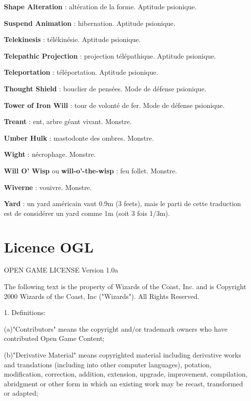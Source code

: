 \documentclass[11pt]{article}
\begin{document}
{\textbf{Shape Alteration} : altération de la forme. Aptitude psionique.

\textbf{Suspend Animation} : hibernation. Aptitude psionique.

\textbf{Telekinesis} : télékinésie. Aptitude psionique.

\textbf{Telepathic Projection} : projection télépathique. Aptitude psionique.

\textbf{Teleportation} : téléportation. Aptitude psionique.

\textbf{Thought Shield} : bouclier de pensées. Mode de défense psionique.

\textbf{Tower of Iron Will} : tour de volonté de fer. Mode de défense psionique.

\textbf{Treant} : ent, arbre géant vivant. Monstre.

\textbf{Umber Hulk} : mastodonte des ombres. Monstre.

\textbf{Wight} : nécrophage. Monstre.

\textbf{Will O’ Wisp} ou \textbf{will-o'-the-wisp} : feu follet. Monstre.

\textbf{Wiverne} : vouivre. Monstre.

\textbf{Yard} : un yard américain vaut 0.9m (3 feets), mais le parti de cette traduction est de considérer un yard comme 1m (soit 3 fois 1/3m).

}%


\newpage
{}\section*{Licence OGL}
\label{OGL}

OPEN GAME LICENSE Version 1.0a

\bigskip

The following text is the property of Wizards of the Coast, Inc. and is Copyright 2000 Wizards of the Coast, Inc ("Wizards"). All Rights Reserved.

\bigskip

1. Definitions:

\bigskip

(a)"Contributors" means the copyright and/or trademark owners who have contributed Open Game Content;

\bigskip

(b)"Derivative Material" means copyrighted material including derivative works and translations (including into other computer languages), potation, modification, correction, addition, extension, upgrade, improvement, compilation, abridgment or other form in which an existing work may be recast, transformed or adapted;
\end{document}

